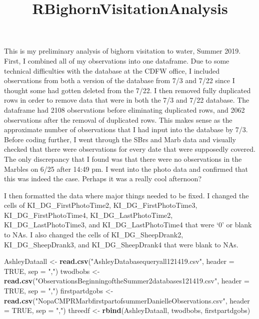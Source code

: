 \documentclass[]{article}
\title{RBighornVisitationAnalysis}
\author{}
\date{}
\newenvironment{Shaded}{\begin{snugshade}}{\end{snugshade}}
\newcommand{\DataTypeTok}[1]{\textcolor[rgb]{0.13,0.29,0.53}{#1}}
\newcommand{\KeywordTok}[1]{\textcolor[rgb]{0.13,0.29,0.53}{\textbf{#1}}}
\newcommand{\NormalTok}[1]{#1}
\newcommand{\OtherTok}[1]{\textcolor[rgb]{0.56,0.35,0.01}{#1}}
\newcommand{\StringTok}[1]{\textcolor[rgb]{0.31,0.60,0.02}{#1}}
\begin{document}
\maketitle

This is my preliminary analysis of bighorn visitation to water, Summer
2019. First, I combined all of my observations into one dataframe. Due
to some technical difficulties with the database at the CDFW office, I
included observations from both a version of the database from 7/3 and
7/22 since I thought some had gotten deleted from the 7/22. I then
removed fully duplicated rows in order to remove data that were in both
the 7/3 and 7/22 database. The dataframe had 2108 observations before
eliminating duplicated rows, and 2062 observations after the removal of
duplicated rows. This makes sense as the approximate number of
observations that I had input into the database by 7/3. Before coding
further, I went through the SBrs and Marb data and visually checked that
there were observations for every date that were supposedly covered. The
only discrepancy that I found was that there were no observations in the
Marbles on 6/25 after 14:49 pm. I went into the photo data and confirmed
that this was indeed the case. Perhaps it was a really cool afternoon?

I then formatted the data where major things needed to be fixed. I
changed the cells of KI\_DG\_FirstPhotoTime2, KI\_DG\_FirstPhotoTime3,
KI\_DG\_FirstPhotoTime4, KI\_DG\_LastPhotoTime2, KI\_DG\_LastPhotoTime3,
and KI\_DG\_LastPhotoTime4 that were `0' or blank to NAs. I also changed
the cells of KI\_DG\_SheepDrank2, KI\_DG\_SheepDrank3, and
KI\_DG\_SheepDrank4 that were blank to NAs.

\begin{Shaded}
\begin{Highlighting}[]
\NormalTok{AshleyDataall <-}\StringTok{ }\KeywordTok{read.csv}\NormalTok{(}\StringTok{"AshleyDatabasequeryall121419.csv"}\NormalTok{, }\DataTypeTok{header =} \OtherTok{TRUE}\NormalTok{, }\DataTypeTok{sep =} \StringTok{","}\NormalTok{)}
\NormalTok{twodbobs <-}\StringTok{ }\KeywordTok{read.csv}\NormalTok{(}\StringTok{"ObservationsBeginningoftheSummer2databases121419.csv"}\NormalTok{, }\DataTypeTok{header =} \OtherTok{TRUE}\NormalTok{, }\DataTypeTok{sep =} \StringTok{","}\NormalTok{)}
\NormalTok{firstpartdgobs <-}\StringTok{ }\KeywordTok{read.csv}\NormalTok{(}\StringTok{"NopaCMPRMarbfirstpartofsummerDanielleObservations.csv"}\NormalTok{, }\DataTypeTok{header =} \OtherTok{TRUE}\NormalTok{, }\DataTypeTok{sep =} \StringTok{","}\NormalTok{)}
\NormalTok{threedf <-}\StringTok{ }\KeywordTok{rbind}\NormalTok{(AshleyDataall, twodbobs, firstpartdgobs)}
\end{Highlighting}
\end{Shaded}
\end{document}
